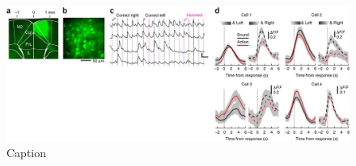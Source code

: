 \begin{figure}[htbp]

\begin{center}
\includegraphics[width=\textwidth]{Figures/NN_fig3.jpg} 
\end{center}

\caption[Two-photon Ca$^{2+}$ imaging of task-related activity in M2]
{Caption}

\label{fig:NN_fig3}
\end{figure}
